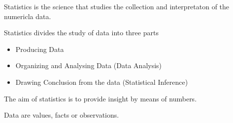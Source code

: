 Statistics is the science that studies the collection and interpretaton of the numericla data.

Statistics divides the study of data into three parts

\begin{itemize}

\item Producing Data

\item Organizing and Analysing Data (Data Analysis)

\item Drawing Conclusion from the data (Statistical Inference)

\end{itemize}


The aim of statistics is to provide insight by means of numbers.


Data are values, facts or observations.

